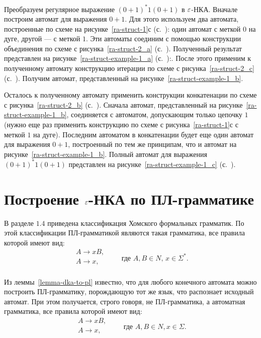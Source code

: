 

\begin{myexample}
Преобразуем регулярное выражение $(0 + 1)^*1(0 + 1)$ в $\varepsilon$-НКА. Вначале построим автомат для выражения $0 + 1$. Для этого используем два автомата, построенные по схеме на рисунке~\ref{ra-struct-1}с (с.~\pageref{ra-struct-1}): один автомат с меткой $0$ на дуге, другой --- с меткой $1$. Эти автоматы соединим с помощью конструкции объединения по схеме с рисунка~\ref{ra-struct-2_a} (с.~\pageref{ra-struct-2_a}). Полученный результат представлен на рисунке~\ref{ra-struct-example-1_a} (с.~\pageref{ra-struct-example-1_a}):. 
После этого применим к полученному автомату конструкцию итерации по схеме с рисунка~\ref{ra-struct-2_c} (с.~\pageref{ra-struct-2_c}). Получим автомат, представленный на рисунке~\ref{ra-struct-example-1_b}. 



Осталось к полученному автомату применить конструкции конкатенации по схеме с рисунка~\ref{ra-struct-2_b} (с.~\pageref{ra-struct-2_b}). Сначала автомат, представленный на рисунке~\ref{ra-struct-example-1_b}, соединяется с автоматом, допускающим только цепочку $1$ (нужно еще раз применить конструкцию по схеме с рисунка~\ref{ra-struct-1}с с меткой $1$ на дуге). Последним автоматом в конкатенации будет еще один автомат для выражения $0 + 1$, построенный по тем же принципам, что и автомат на рисунке~\ref{ra-struct-example-1_b}.
Полный автомат для выражения $(0 + 1)^*1(0 + 1)$ представлен на рисунке~\ref{ra-struct-example-1_c} (с.~\pageref{ra-struct-example-1_c}).
\end{myexample}



\section{Построение $\varepsilon$-НКА по ПЛ-грамматике}
\label{Chapter4GramtoFA}

В разделе $1.4$ приведена классификация Хомского формальных грамматик. По этой классификации ПЛ-грамматикой являются такая грамматика, все правила которой имеют вид:
\[
	\begin{array}{l}
	A \to xB, \\
	A \to x, \\
	\end{array} \qquad \text{где $A,B \in N$, $x\in\Sigma^*$.}
\]


Из леммы~\ref{lemma-dka-to-pl} известно, что для любого конечного автомата можно построить ПЛ-грамматику, порождающую тот же язык, что распознает исходный автомат. При этом получается, строго говоря, не ПЛ-грамматика, а автоматная грамматика, все правила которой имеют вид:
\[
 \begin{array}{l}
	A \to xB, \\
	A \to x, \\
	\end{array}\qquad \text{где $A,B \in N, x\in\Sigma$.}
\]

